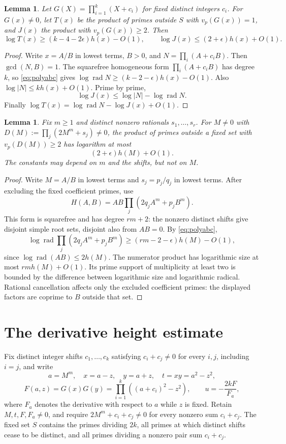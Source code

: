 \documentclass[11pt,a4paper]{article}
\newtheorem{lemma}[theorem]{Lemma}
\DeclareMathOperator{\rad}{rad}\DeclareMathOperator{\Tr}{Tr}
\begin{document}
\begin{lemma}\label{lem:simple}
Let $G(X)=\prod_{i=1}^k(X+c_i)$ for fixed distinct integers $c_i$.
For $G(x)\ne0$, let $T(x)$ be the product of primes outside $S$
with $v_p(G(x))=1$, and $J(x)$ the product with
$v_p(G(x))\ge2$. Then
\[
 \log T(x)\ge(k-4-2\epsilon)h(x)-O(1),\qquad
 \log J(x)\le(2+\epsilon)h(x)+O(1).
\]
\end{lemma}
\begin{proof}
Write $x=A/B$ in lowest terms, $B>0$, and
$N=\prod_i(A+c_iB)$. Then $\gcd(N,B)=1$.
The squarefree homogeneous form $\prod_i(A+c_iB)$ has degree $k$,
so \eqref{eq:polyabc} gives
$\log\rad N\ge(k-2-\epsilon)h(x)-O(1)$.
Also $\log|N|\le k h(x)+O(1)$. Prime by prime,
\[
 \log J(x)\le\log|N|-\log\rad N.
\]
Finally $\log T(x)=\log\rad N-\log J(x)+O(1)$.
\end{proof}

\begin{lemma}\label{lem:power-multiple}
Fix $m\ge1$ and distinct nonzero rationals $s_1,\ldots,s_r$.
For $M\ne0$ with $D(M):=\prod_j(2M^m+s_j)\ne0$, the product
of primes outside a fixed set with $v_p(D(M))\ge2$ has logarithm
at most
\[
                         (2+\epsilon)h(M)+O(1).
\]
The constants may depend on $m$ and the shifts, but not on $M$.
\end{lemma}
\begin{proof}
Write $M=A/B$ in lowest terms and $s_j=p_j/q_j$ in lowest terms.
After excluding the fixed coefficient primes, use
\[
 H(A,B)=AB\prod_j(2q_jA^m+p_jB^m).
\]
This form is squarefree and has degree $rm+2$: the nonzero distinct
shifts give disjoint simple root sets, disjoint also from $AB=0$.
By \eqref{eq:polyabc},
\[
 \log\rad\prod_j(2q_jA^m+p_jB^m)
              \ge(rm-2-\epsilon)h(M)-O(1),
\]
since $\log\rad(AB)\le2h(M)$.
The numerator product has logarithmic size at most $rm h(M)+O(1)$.
Its prime support of multiplicity at least two is bounded by the
difference between logarithmic size and logarithmic radical.
Rational cancellation affects only the excluded coefficient primes:
the displayed factors are coprime to $B$ outside that set.
\end{proof}

\section{The derivative height estimate}

Fix distinct integer shifts $c_1,\ldots,c_k$ satisfying
$c_i+c_j\ne0$ for every $i,j$, including $i=j$, and write
\[
 a=M^m,\quad x=a-z,\quad y=a+z,\quad t=xy=a^2-z^2,
\]
\[
 F(a,z)=G(x)G(y)=\prod_{i=1}^k((a+c_i)^2-z^2),\qquad
                         u=-\frac{2kF}{F_a},
\]
where $F_a$ denotes the derivative with respect to $a$ while $z$ is
fixed. Retain $M,t,F,F_a\ne0$, and require
$2M^m+c_i+c_j\ne0$ for every nonzero sum $c_i+c_j$.
The fixed set $S$ contains the primes dividing $2k$, all primes at which distinct shifts cease to be distinct, and
all primes dividing a nonzero pair sum $c_i+c_j$.
\end{document}
